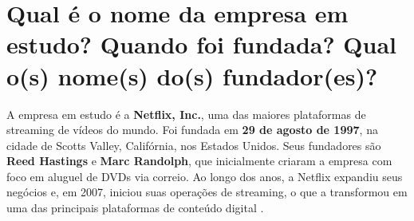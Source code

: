 \section{Qual é o nome da empresa em estudo? Quando foi fundada? Qual o(s) nome(s) do(s) fundador(es)?}

A empresa em estudo é a \textbf{Netflix, Inc.}, uma das maiores plataformas de streaming de vídeos do mundo. Foi fundada em \textbf{29 de agosto de 1997}, na cidade de Scotts Valley, Califórnia, nos Estados Unidos. Seus fundadores são \textbf{Reed Hastings} e \textbf{Marc Randolph}, que inicialmente criaram a empresa com foco em aluguel de DVDs via correio. Ao longo dos anos, a Netflix expandiu seus negócios e, em 2007, iniciou suas operações de streaming, o que a transformou em uma das principais plataformas de conteúdo digital \cite{netflix_historico}.

